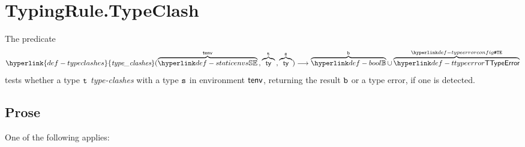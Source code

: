 \documentclass{book}
\newcommand\typeclashes[0]{\hyperlink{def-typeclashes}{\textfunc{type\_clashes}}}
\begin{document}

\section{TypingRule.TypeClash\label{sec:TypingRule.TypeClash}}
\hypertarget{def-typeclashes}{}
The predicate
\[
  \typeclashes(\overname{\staticenvs}{\tenv} \aslsep \overname{\ty}{\vt} \aslsep \overname{\ty}{\vs})
  \aslto \overname{\Bool}{\vb} \cup \overname{\TTypeError}{\TypeErrorConfig}
\]
tests whether a type $\texttt{t}$ \emph{type-clashes} with a type $\texttt{s}$ in environment $\textsf{tenv}$,
returning the result $\texttt{b}$ or a type error, if one is detected.

\subsection{Prose}
 One of the following applies:
\end{document}
